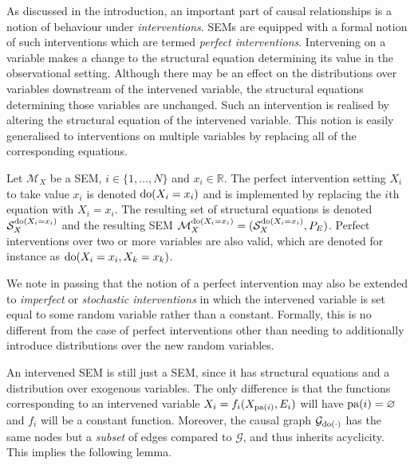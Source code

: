 As discussed in the introduction, an important part of causal relationships is a notion of behaviour under \emph{interventions}. 
SEMs are equipped with a formal notion of such interventions which are termed \emph{perfect interventions}. 
Intervening on a variable makes a change to the structural equation determining its value in the observational setting.
Although there may be an effect on the distributions over variables downstream of the intervened variable, the structural equations determining those variables are unchanged. 
Such an intervention is realised by altering the structural equation of the intervened variable. This notion is easily generalised to interventions on multiple variables by replacing all of the corresponding equations. 

\medskip

\begin{definition}
	Let $\mathcal{M}_X$ be a SEM, $i \in \{1,\ldots,N \}$ and $x_i \in \mathbb{R}$. The perfect intervention setting $X_i$ to take value $x_i$ is denoted $\operatorname{do}(X_i = x_i)$ and is implemented by replacing the $i$th equation with $X_i = x_i$. The resulting set of structural equations is denoted $\mathcal{S}_X^{\operatorname{do}(X_i=x_i)}$ and the resulting SEM $\mathcal{M}_X^{\operatorname{do}(X_i=x_i)} = (\mathcal{S}_X^{\operatorname{do}(X_i=x_i)}, P_E)$.
	Perfect interventions over two or more variables are also valid, which are denoted for instance as $\operatorname{do}(X_i = x_i, X_k = x_k)$.
\end{definition}

We note in passing that the notion of a perfect intervention may also be extended to \emph{imperfect} or \emph{stochastic interventions} in which the intervened variable is set equal to some random variable rather than a constant. Formally, this is no different from the case of perfect interventions other than needing to additionally introduce distributions over the new random variables. 

An intervened SEM is still just a SEM, since it has structural equations and a distribution over exogenous variables. The only difference is that the functions corresponding to an intervened variable $X_i = f_i(X_{\operatorname{pa}(i)}, E_i)$ will have $\operatorname{pa}(i) = \varnothing$ and $f_i$ will be a constant function. Moreover, the causal graph $\mathcal{G}_{\operatorname{do}(\cdot)}$ has the same nodes but a \emph{subset} of edges compared to $\mathcal{G}$, and thus inherits acyclicity. This implies the following lemma.


